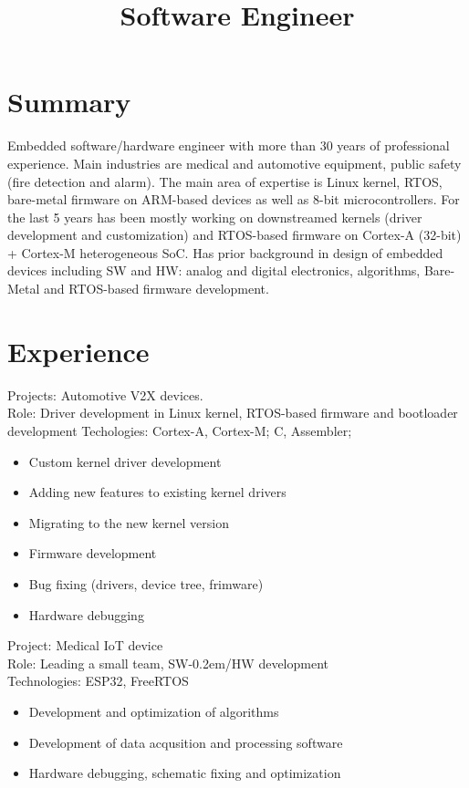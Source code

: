 \documentclass[11pt,a4paper]{moderncv}
\title{Software Engineer}
\begin{document}
\renewcommand*{\bibliographyhead}[1]{}

\maketitle

\section{Summary}
Embedded software/hardware engineer with more than 30 years of professional experience.
Main industries are medical and automotive equipment, public safety (fire detection and alarm).
The main area of expertise is Linux kernel, RTOS, bare-metal firmware on ARM-based devices
as well as 8-bit microcontrollers.
For the last 5 years has been mostly working on downstreamed kernels (driver development and customization) and
RTOS-based firmware on Cortex-A (32-bit) + \mbox{Cortex-M} heterogeneous SoC.
Has prior background in design of embedded devices including SW and HW: analog and digital electronics,
algorithms, Bare-Metal and RTOS-based firmware development.

\section{Experience}

  {Projects: Automotive V2X devices.\\
    Role: Driver development in Linux kernel, RTOS-based firmware and bootloader development
    Techologies: Cortex-A, Cortex-M; C, Assembler;
    \begin{itemize}
      \item Custom kernel driver development
      \item Adding new features to existing kernel drivers
      \item Migrating to the new kernel version
      \item Firmware development
      \item Bug fixing (drivers, device tree, frimware)
      \item Hardware debugging
    \end{itemize}}

  {Project: Medical IoT device\\
    Role: Leading a small team, SW\kern-0.2em/HW development\\
    Technologies: ESP32, FreeRTOS
    \begin{itemize}
      \item Development and optimization of algorithms
      \item Development of data acqusition and processing software
      \item Hardware debugging, schematic fixing and optimization
    \end{itemize}}
\end{document}
